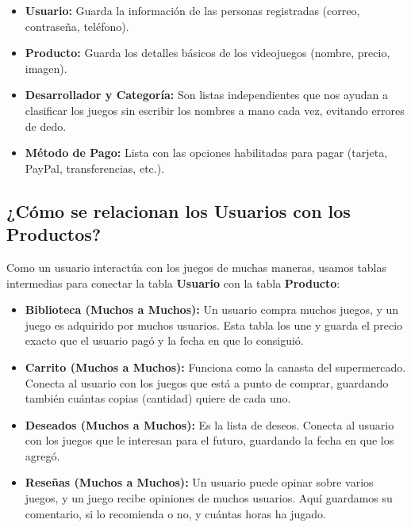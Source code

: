 \documentclass[11pt,a4paper]{article}
\begin{document}
\begin{itemize}
\item \textbf{Usuario:} Guarda la información de las personas registradas (correo, contraseña, teléfono).

\item \textbf{Producto:} Guarda los detalles básicos de los videojuegos (nombre, precio, imagen).

\item \textbf{Desarrollador y Categoría:} Son listas independientes que nos ayudan a clasificar los juegos sin escribir los nombres a mano cada vez, evitando errores de dedo.

\item \textbf{Método de Pago:} Lista con las opciones habilitadas para pagar (tarjeta, PayPal, transferencias, etc.).
\end{itemize}

\subsection{¿Cómo se relacionan los Usuarios con los Productos?}

Como un usuario interactúa con los juegos de muchas maneras, usamos tablas intermedias para conectar la tabla \textbf{Usuario} con la tabla \textbf{Producto}:

\begin{itemize}
\item \textbf{Biblioteca (Muchos a Muchos):} Un usuario compra muchos juegos, y un juego es adquirido por muchos usuarios. Esta tabla los une y guarda el precio exacto que el usuario pagó y la fecha en que lo consiguió.

\item \textbf{Carrito (Muchos a Muchos):} Funciona como la canasta del supermercado. Conecta al usuario con los juegos que está a punto de comprar, guardando también cuántas copias (cantidad) quiere de cada uno.

\item \textbf{Deseados (Muchos a Muchos):} Es la lista de deseos. Conecta al usuario con los juegos que le interesan para el futuro, guardando la fecha en que los agregó.

\item \textbf{Reseñas (Muchos a Muchos):} Un usuario puede opinar sobre varios juegos, y un juego recibe opiniones de muchos usuarios. Aquí guardamos su comentario, si lo recomienda o no, y cuántas horas ha jugado.
\end{itemize}
\end{document}
